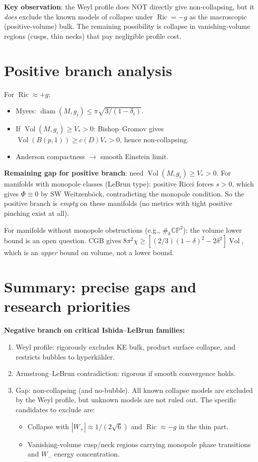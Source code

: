 \textbf{Key observation}: the Weyl profile does NOT directly give
non-collapsing, but it \emph{does} exclude the known models of collapse
under \(\operatorname{Ric}=-g\) as the macroscopic (positive-volume) bulk.
The remaining possibility is collapse in vanishing-volume regions (cusps,
thin necks) that pay negligible profile cost.

\section{Positive branch analysis}

For \(\operatorname{Ric}\approx+g\):
\begin{itemize}
\item Myers: \(\operatorname{diam}(M,g_i)\le\pi\sqrt{3/(1-\delta_i)}\).
\item If \(\operatorname{Vol}(M,g_i)\ge V_*>0\):
  Bishop--Gromov gives \(\operatorname{Vol}(B(p,1))\ge c(D)V_*>0\),
  hence non-collapsing.
\item Anderson compactness \(\to\) smooth Einstein limit.
\end{itemize}

\textbf{Remaining gap for positive branch}: need
\(\operatorname{Vol}(M,g_i)\ge V_*>0\).  For manifolds with monopole
classes (LeBrun type): positive Ricci forces \(s>0\), which gives
\(\Phi\equiv0\) by SW Weitzenb\"ock, contradicting the monopole condition.
So the positive branch is \emph{empty} on these manifolds (no metrics with
tight positive pinching exist at all).

For manifolds without monopole obstructions (e.g., \(\#_k\mathbb{CP}^2\)):
the volume lower bound is an open question.  CGB gives
\(8\pi^2\chi\ge[(2/3)(1-\delta)^2-2\delta^2]\operatorname{Vol}\), which
is an \emph{upper} bound on volume, not a lower bound.

\section{Summary: precise gaps and research priorities}

\textbf{Negative branch on critical Ishida--LeBrun families:}
\begin{enumerate}
\item Weyl profile: rigorously excludes KE bulk, product surface collapse,
  and restricts bubbles to hyperk\"ahler.
\item Armstrong--LeBrun contradiction: rigorous if smooth convergence holds.
\item Gap: non-collapsing (and no-bubble).  All known collapse models are
  excluded by the Weyl profile, but unknown models are not ruled out.
  The specific candidates to exclude are:
  \begin{itemize}
  \item Collapse with \(|W_+|\approx1/(2\sqrt6)\) and
    \(\operatorname{Ric}\approx-g\) in the thin part.
  \item Vanishing-volume cusp/neck regions carrying monopole phase
    transitions and \(W_-\) energy concentration.
  \end{itemize}
\end{enumerate}

